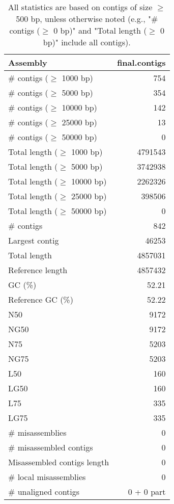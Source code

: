 \documentclass[12pt,a4paper]{article}
\begin{document}
\begin{table}[ht]
\begin{center}
\caption{All statistics are based on contigs of size $\geq$ 500 bp, unless otherwise noted (e.g., "\# contigs ($\geq$ 0 bp)" and "Total length ($\geq$ 0 bp)" include all contigs).}
\begin{tabular}{|l*{1}{|r}|}
\hline
Assembly & final.contigs \\ \hline
\# contigs ($\geq$ 1000 bp) & 754 \\ \hline
\# contigs ($\geq$ 5000 bp) & 354 \\ \hline
\# contigs ($\geq$ 10000 bp) & 142 \\ \hline
\# contigs ($\geq$ 25000 bp) & 13 \\ \hline
\# contigs ($\geq$ 50000 bp) & 0 \\ \hline
Total length ($\geq$ 1000 bp) & 4791543 \\ \hline
Total length ($\geq$ 5000 bp) & 3742938 \\ \hline
Total length ($\geq$ 10000 bp) & 2262326 \\ \hline
Total length ($\geq$ 25000 bp) & 398506 \\ \hline
Total length ($\geq$ 50000 bp) & 0 \\ \hline
\# contigs & 842 \\ \hline
Largest contig & 46253 \\ \hline
Total length & 4857031 \\ \hline
Reference length & 4857432 \\ \hline
GC (\%) & 52.21 \\ \hline
Reference GC (\%) & 52.22 \\ \hline
N50 & 9172 \\ \hline
NG50 & 9172 \\ \hline
N75 & 5203 \\ \hline
NG75 & 5203 \\ \hline
L50 & 160 \\ \hline
LG50 & 160 \\ \hline
L75 & 335 \\ \hline
LG75 & 335 \\ \hline
\# misassemblies & 0 \\ \hline
\# misassembled contigs & 0 \\ \hline
Misassembled contigs length & 0 \\ \hline
\# local misassemblies & 0 \\ \hline
\# unaligned contigs & 0 + 0 part \\ \hline

\end{tabular}
\end{center}
\end{table}
\end{document}
